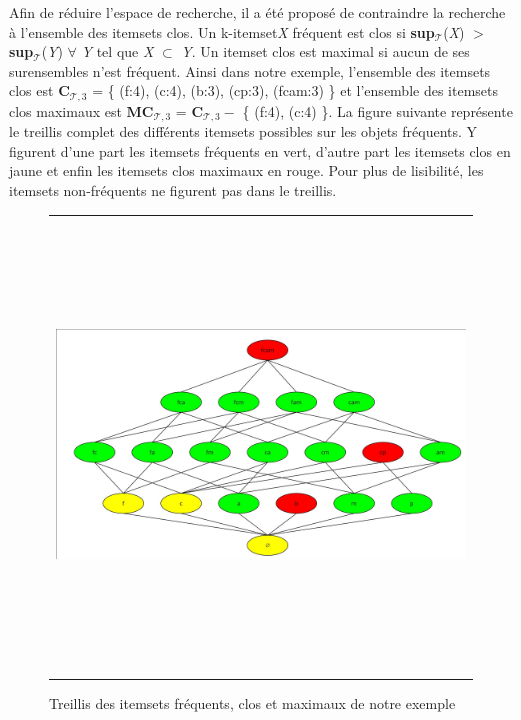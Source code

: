 \documentclass[a4paper,10pt]{report}
\begin{document}
	Afin de réduire l'espace de recherche, il a été proposé de contraindre la recherche à l'ensemble des itemsets clos. Un k-itemset\emph{X} fréquent est clos si \textbf{sup$_{\mathcal{T}}$}(\emph{X}) $>$ \textbf{sup$_{\mathcal{T}}$}(\emph{Y}) $ \forall  $ \emph{Y} tel que \emph{X} $ \subset $ \emph{Y}.  Un itemset clos est maximal si aucun de ses surensembles n'est fréquent. Ainsi dans notre exemple, l'ensemble des itemsets clos est   $\textbf{C}_{\mathcal{T},3}$ = \{ (f:4), (c:4), (b:3), (cp:3), (fcam:3) \} et l'ensemble des itemsets clos maximaux est  $\textbf{MC}_{\mathcal{T},3}$ =  $\textbf{C}_{\mathcal{T},3} - $ \{ (f:4), (c:4) \}. La figure suivante représente le treillis complet des différents itemsets possibles sur les objets fréquents. Y figurent d'une part les itemsets fréquents en vert, d'autre part les itemsets clos en jaune et enfin les itemsets clos maximaux en rouge. Pour plus de lisibilité, les itemsets non-fréquents ne figurent pas dans le treillis.\\

\begin{figure}
	\begin{adjustwidth}{-2.7cm}{}
	\begin{tabular}{l}
	\includegraphics[width=15cm,height=12cm]{./img/treillis_is.jpg}\\
	\end{tabular}
	\caption{\label{fig:text}Treillis des itemsets fréquents, clos et maximaux de notre exemple}
	\end{adjustwidth}
\end{figure}
\end{document}
